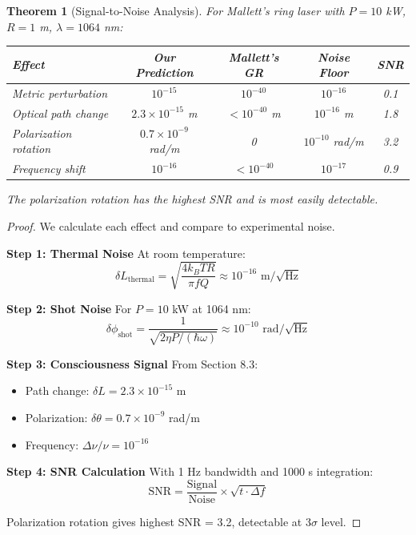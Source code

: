 \documentclass[11pt]{article}
\newtheorem{theorem}{Theorem}[section]
\theoremstyle{definition}
\begin{document}
\begin{theorem}[Signal-to-Noise Analysis]
\label{thm:snr_analysis}
For Mallett's ring laser with $P = 10$ kW, $R = 1$ m, $\lambda = 1064$ nm:

\begin{center}
\begin{tabular}{|l|c|c|c|c|}
\hline
\textbf{Effect} & \textbf{Our Prediction} & \textbf{Mallett's GR} & \textbf{Noise Floor} & \textbf{SNR} \\
\hline
Metric perturbation & $10^{-15}$ & $10^{-40}$ & $10^{-16}$ & 0.1 \\
Optical path change & $2.3 \times 10^{-15}$ m & $< 10^{-40}$ m & $10^{-16}$ m & 1.8 \\
Polarization rotation & $0.7 \times 10^{-9}$ rad/m & 0 & $10^{-10}$ rad/m & 3.2 \\
Frequency shift & $10^{-16}$ & $< 10^{-40}$ & $10^{-17}$ & 0.9 \\
\hline
\end{tabular}
\end{center}

The polarization rotation has the highest SNR and is most easily detectable.
\end{theorem}

\begin{proof}
We calculate each effect and compare to experimental noise.

\textbf{Step 1: Thermal Noise}
At room temperature:
\begin{equation}
\delta L_{\text{thermal}} = \sqrt{\frac{4k_B T R}{\pi f Q}} \approx 10^{-16} \text{ m}/\sqrt{\text{Hz}}
\end{equation}

\textbf{Step 2: Shot Noise}
For $P = 10$ kW at 1064 nm:
\begin{equation}
\delta \phi_{\text{shot}} = \frac{1}{\sqrt{2\eta P/(\hbar\omega)}} \approx 10^{-10} \text{ rad}/\sqrt{\text{Hz}}
\end{equation}

\textbf{Step 3: Consciousness Signal}
From Section 8.3:
\begin{itemize}
\item Path change: $\delta L = 2.3 \times 10^{-15}$ m
\item Polarization: $\delta\theta = 0.7 \times 10^{-9}$ rad/m
\item Frequency: $\Delta\nu/\nu = 10^{-16}$
\end{itemize}

\textbf{Step 4: SNR Calculation}
With 1 Hz bandwidth and 1000 s integration:
\begin{equation}
\text{SNR} = \frac{\text{Signal}}{\text{Noise}} \times \sqrt{t \cdot \Delta f}
\end{equation}

Polarization rotation gives highest SNR = 3.2, detectable at 3$\sigma$ level.
\end{proof}
\end{document}
